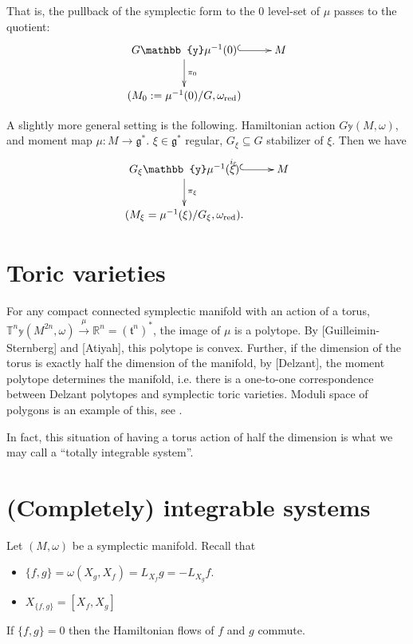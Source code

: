 \noindent
That is, the pullback of the symplectic form to the 
0 level-set of $\mu$ passes to the quotient:
$$
\xymatrix{
G \mathbb{y} \mu^{-1}(0)\ar[d]^{\pi_0}\ar@{^{(}->}[r]& M\\
(M_0:=\mu^{-1}(0)/G,\omega_{\text{red}})
}
$$

\noindent
A slightly more general setting is the following.
Hamiltonian action $G \mathbb{y} (M,\omega)$,
and moment map
$\mu:M \to \mathfrak{g}^*$.
$\xi \in \mathfrak{g}^*$ regular, $G_\xi \subseteq G$
stabilizer of $\xi$.
Then we have
$$
\xymatrix{
G_\xi \mathbb{y} \mu^{-1}(\xi)\ar[d]^{\pi_\xi}\ar@{^{(}->}[r]^{i_\xi}& M\\
(M_\xi=\mu^{-1}(\xi)/G_\xi,\omega_{\text{red}}).
}
$$

\section{Toric varieties}
\label{section-toric-varieties}

\noindent
For any compact connected symplectic manifold with an action of a torus,
$\mathbb{T}^n \mathbb{y} (M^{2n},\omega)\xrightarrow{\mu}\mathbb{R}^n
=(\mathfrak{t}^n)^*$, the image of $\mu$
is a polytope. By [Guilleimin-Sternberg] and [Atiyah], this polytope is
convex. Further, if the dimension of the torus is exactly half
the dimension of the manifold, by [Delzant], the moment polytope
determines the manifold, i.e. there is a one-to-one
correspondence between
Delzant polytopes and symplectic toric varieties.
Moduli space of polygons is an example of this,
see \cite{moduli-polygons}.

In fact, this situation of having a torus action of half the dimension
is what we may call a ``totally integrable system''.

\section{(Completely) integrable systems}
\label{section-completely-integrable-systems}

\noindent
Let $(M,\omega)$ be a symplectic manifold.
Recall that

\begin{itemize}
\item $\{f,g\}=\omega(X_g,X_f)=L_{X_f}g=-L_{X_g}f$.
\item $X_{\{f,g\}}=[X_f,X_g]$
\end{itemize}

\noindent
If $\{f,g\}=0$ then the Hamiltonian flows of $f$ and $g$ commute.

